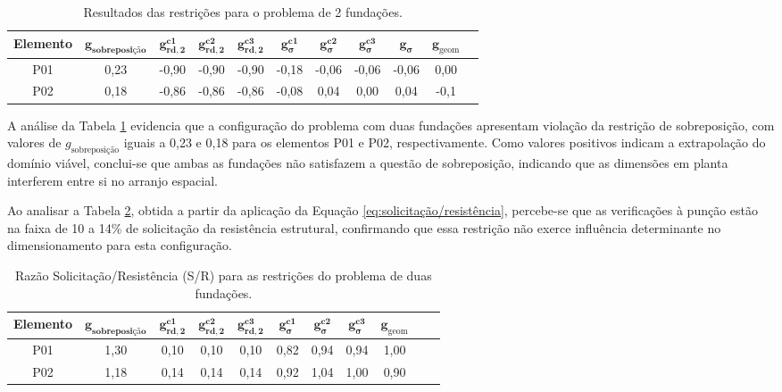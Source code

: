 \begin{table}[H]
\centering
\caption{Resultados das restrições para o problema de 2 fundações.}
\label{tab:resultado_g_2_fundacoes}
\begin{tabular}{ccccccccccc}
\toprule
\textbf{Elemento} &
$\mathbf{g_{\textbf{sobreposição}}}$ &
$\mathbf{g_{rd,2}^{c1}}$ &
$\mathbf{g_{rd,2}^{c2}}$ &
$\mathbf{g_{rd,2}^{c3}}$ &
$\mathbf{g_{\sigma}^{c1}}$ &
$\mathbf{g_{\sigma}^{c2}}$ &
$\mathbf{g_{\sigma}^{c3}}$ &
$\mathbf{g_{\sigma}}$ &
$\mathbf{g_{\mathrm{geom}}}$ \\
\midrule
P01 & 0,23 &-0,90 &	-0,90	& -0,90 & -0,18 & -0,06 & -0,06 & -0,06 & 0,00 \\
P02 & 0,18 & -0,86 & -0,86 & -0,86 & -0,08 & 0,04 & 0,00 & 0,04 & -0,1 \\
\bottomrule
\end{tabular}
\end{table}

A análise da Tabela \ref{tab:resultado_g_2_fundacoes} evidencia que a configuração do problema com duas fundações apresentam violação da restrição de sobreposição, com valores de $g_{\text{sobreposição}}$ iguais a 0,23 e 0,18 para os elementos P01 e P02, respectivamente. Como valores positivos indicam a extrapolação do domínio viável, conclui-se que ambas as fundações não satisfazem a questão de sobreposição, indicando que as dimensões em planta interferem entre si no arranjo espacial.

Ao analisar a Tabela \ref{tab:S/R_duas_fundação}, obtida a partir da aplicação da Equação \eqref{eq:solicitação/resistência}, percebe-se que as verificações à punção estão na faixa de 10 a 14\% de solicitação da resistência estrutural, confirmando que essa restrição não exerce influência determinante no dimensionamento para esta configuração.


\begin{table}[htpb!]
\centering
\caption{Razão Solicitação/Resistência (S/R) para as restrições do problema de duas fundações.}
\label{tab:S/R_duas_fundação}
\begin{tabular}{ccccccccccc}
\toprule
\textbf{Elemento} &
$\mathbf{g_{\textbf{sobreposição}}}$ &
$\mathbf{g_{rd,2}^{c1}}$ &
$\mathbf{g_{rd,2}^{c2}}$ &
$\mathbf{g_{rd,2}^{c3}}$ &
$\mathbf{g_{\sigma}^{c1}}$ &
$\mathbf{g_{\sigma}^{c2}}$ &
$\mathbf{g_{\sigma}^{c3}}$ &
$\mathbf{g_{\mathrm{geom}}}$ \\
\midrule
P01 & 1,30 & 0,10 & 0,10 & 0,10 & 0,82 & 0,94 & 0,94 & 1,00 \\
P02 & 1,18 & 0,14 & 0,14 & 0,14 & 0,92 & 1,04 & 1,00 & 0,90\\
\bottomrule
\end{tabular}
\end{table}

